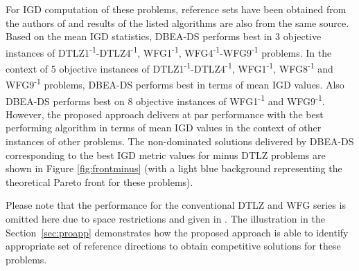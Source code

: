 \documentclass{sig-alternate}
\begin{document}
For IGD computation of these problems, reference sets have been obtained from the authors of \cite{ishibuchi2016inverse} and results of the listed algorithms are also from the same source\cite{ishibuchi2016inverse}. Based on the mean IGD statistics, DBEA-DS performs best in 3 objective instances of DTLZ1\textsuperscript{-1}-DTLZ4\textsuperscript{-1}, WFG1\textsuperscript{-1}, WFG4\textsuperscript{-1}-WFG9\textsuperscript{-1} problems. In the context of 5 objective instances of DTLZ1\textsuperscript{-1}-DTLZ4\textsuperscript{-1}, WFG1\textsuperscript{-1}, WFG8\textsuperscript{-1} and WFG9\textsuperscript{-1} problems, DBEA-DS performs best in terms of mean IGD values. Also DBEA-DS performs best on 8 objective instances of WFG1\textsuperscript{-1} and WFG9\textsuperscript{-1}. However, the proposed approach delivers at par performance with the best performing algorithm in terms of mean IGD values in the context of other instances of other problems. The non-dominated solutions delivered by DBEA-DS corresponding to the best IGD metric values for minus DTLZ problems are shown in Figure \ref{fig:frontminus} (with a light blue background representing the theoretical Pareto front for these problems).

Please note that the performance for the conventional DTLZ and WFG series is omitted here due to space restrictions and given in \cite{mdonormal}. The illustration in the Section~\ref{sec:proapp} demonstrates how the proposed approach is able to identify appropriate set of reference directions to obtain competitive solutions for these problems. 
\end{document}
